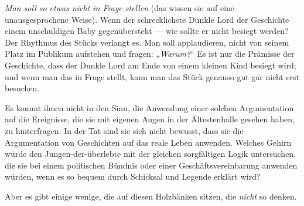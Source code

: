 \emph{Man soll so etwas nicht in Frage stellen} (das wissen sie auf eine unausgesprochene Weise). Wenn der schrecklichste Dunkle Lord der Geschichte einem unschuldigen Baby gegenübersteht — wie sollte er nicht besiegt werden? Der Rhythmus des Stücks verlangt es. Man soll applaudieren, nicht von seinem Platz im Publikum aufstehen und fragen:
„\emph{Warum?}“ Es ist nur die Prämisse der Geschichte, dass der Dunkle Lord am Ende von einem kleinen Kind besiegt wird; und wenn man das in Frage stellt, kann man das Stück genauso gut gar nicht erst besuchen.

Es kommt ihnen nicht in den Sinn, die Anwendung einer solchen Argumentation auf die Ereignisse, die sie mit eigenen Augen in der Ältestenhalle gesehen haben, zu hinterfragen. In der Tat sind sie sich nicht bewusst, dass sie die Argumentation von Geschichten auf das reale Leben anwenden. Welches Gehirn würde den Jungen-der-überlebte mit der gleichen sorgfältigen Logik untersuchen, die sie bei einem politischen Bündnis oder einer Geschäftsvereinbarung anwenden würden, wenn es so bequem durch Schicksal und Legende erklärt wird?

Aber es gibt einige wenige, die auf diesen Holzbänken sitzen, die \emph{nicht} so denken.

